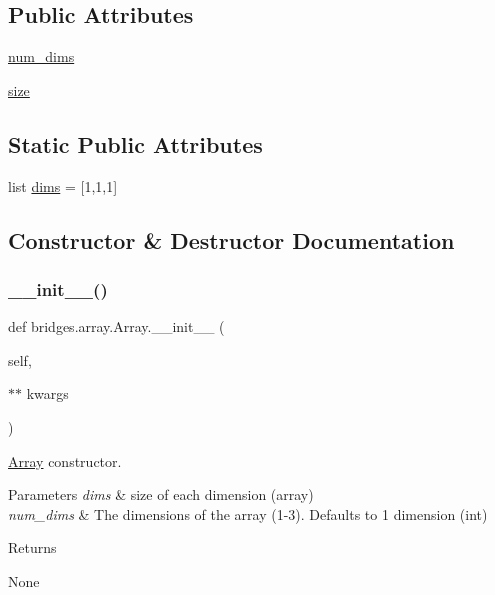 \subsection*{Public Attributes}
\begin{DoxyCompactItemize}
\item 
\mbox{\hyperlink{classbridges_1_1array_1_1_array_a2c28c3658312289dc2ae78f4099d4c76}{num\+\_\+dims}}
\item 
\mbox{\hyperlink{classbridges_1_1array_1_1_array_aeac1b1639d0284500f354d41b40c38f7}{size}}
\end{DoxyCompactItemize}
\subsection*{Static Public Attributes}
\begin{DoxyCompactItemize}
\item 
list \mbox{\hyperlink{classbridges_1_1array_1_1_array_a69f2c673a6077e203b3e916dd73cd243}{dims}} = \mbox{[}1,1,1\mbox{]}
\end{DoxyCompactItemize}


\subsection{Constructor \& Destructor Documentation}
\mbox{\label{classbridges_1_1array_1_1_array_a84c1237ed71850f141cd0cac5a8f77c3}} 
\subsubsection{\texorpdfstring{\_\_init\_\_()}{\_\_init\_\_()}}
{\footnotesize\ttfamily def bridges.\+array.\+Array.\+\_\+\+\_\+init\+\_\+\+\_\+ (\begin{DoxyParamCaption}\item[{}]{self,  }\item[{$\ast$$\ast$}]{kwargs }\end{DoxyParamCaption})}



\mbox{\hyperlink{classbridges_1_1array_1_1_array}{Array}} constructor. 


\begin{DoxyParams}{Parameters}
{\em dims} & size of each dimension (array) \\
\hline
{\em num\+\_\+dims} & The dimensions of the array (1-\/3). Defaults to 1 dimension (int) \\
\hline
\end{DoxyParams}
\begin{DoxyReturn}{Returns}


None 
\end{DoxyReturn}


